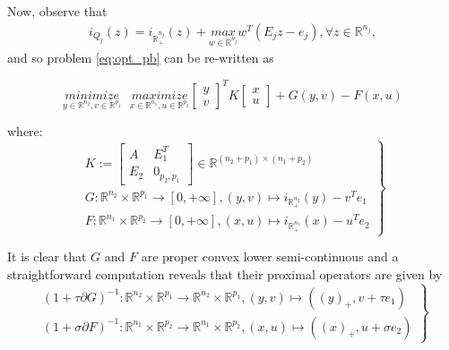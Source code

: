 \documentclass[a4paper,9pt,journal]{IEEEtran}
\begin{document}
Now, observe that
\begin{eqnarray*}
  i_{Q_j}(z) = i_{\mathbb{R}^{n_j}_+}(z) + \underset{w \in \mathbb{R}^{n_j}}{max}\text{}{w^T(E_jz - e_j)}, \forall z \in \mathbb{R}^{n_j},
\end{eqnarray*}
and so problem \eqref{eq:opt_pb} can be re-written as

\begin{equation}
  \underset{y \in \mathbb{R}^{n_2}, v\in \mathbb{R}^{p_1}}{minimize}\text{ }\underset{x \in \mathbb{R}^{n_1}, u \in \mathbb{R}^{p_2}}{maximize}
           {\begin{bmatrix}y\\v\end{bmatrix}^TK\begin{bmatrix}x\\u\end{bmatrix} + G(y, v) - F(x, u)}
  \label{eq:my_opt_pb}
\end{equation}

where:
\begin{equation}
  \left .
  \begin{split}
    K :=
    \left[
      \begin{array}{c|c}
        A & E_1^T \\ \hline
        E_2 & 0_{p_2, p_1}
      \end{array}
      \right] \in \mathbb{R}^{(n_2 + p_1) \times (n_1 + p_2)} \\
      G: \mathbb{R}^{n_2} \times \mathbb{R}^{p_1} \rightarrow [0, +\infty], (y, v) \mapsto i_{\mathbb{R}^{n_2}_+}(y) - v^Te_1\\
      F: \mathbb{R}^{n_1} \times \mathbb{R}^{p_2} \rightarrow [0, +\infty], (x, u) \mapsto i_{\mathbb{R}^{n_1}_+}(x) - u^Te_2
  \end{split}
  \right\}
\end{equation}

It is clear that $G$ and $F$ are proper convex lower semi-continuous and a straightforward computation reveals that their proximal operators are given by
\begin{equation}
  \left .
  \begin{split}
    (1 + \tau \partial G)^{-1}: \mathbb{R}^{n_2} \times \mathbb{R}^{p_1} \rightarrow \mathbb{R}^{n_2} \times \mathbb{R}^{p_1}, (y, v) \mapsto ((y)_+, v + \tau e_1)\\
    (1 + \sigma \partial F)^{-1}: \mathbb{R}^{n_1} \times \mathbb{R}^{p_2} \rightarrow \mathbb{R}^{n_1} \times \mathbb{R}^{p_2}, (x, u) \mapsto ((x)_+, u + \sigma e_2)
  \end{split}
  \right\}
\end{equation}
\end{document}
